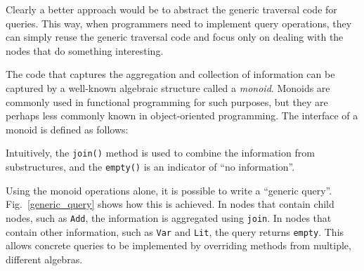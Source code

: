 Clearly a better approach would be to abstract the generic traversal
code for queries. This way, when programmers need to implement query
operations, they can simply reuse the generic traversal code and
focus only on dealing with the nodes that do something interesting.



The code that captures the aggregation and collection of information
can be captured by a well-known algebraic structure called a
\emph{monoid}. Monoids are commonly used in functional programming
for such purposes, but they are perhaps less commonly known in
object-oriented programming.  The interface of a monoid is defined as follows:
\begin{quote}
\end{quote}
Intuitively, the \lstinline{join()} method is
used to combine the information from substructures, and the
\lstinline{empty()} is an indicator of ``no information''.

Using the monoid operations alone, it is possible to write a ``generic
query''. Fig.~\ref{generic_query} shows how this is achieved. In
nodes that contain child nodes, such as \lstinline{Add}, the
information is aggregated using \lstinline{join}. In nodes that
contain other information, such as \lstinline{Var} and
\lstinline{Lit}, the query returns \lstinline{empty}.
This allows concrete queries to be implemented by overriding methods from multiple, different algebras. 

